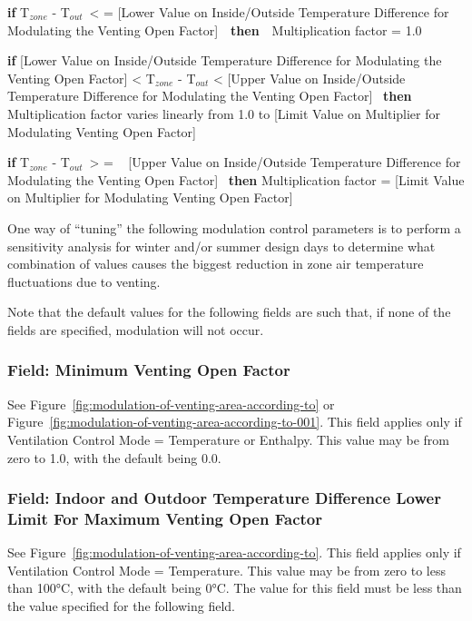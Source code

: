 \textbf{if} T\(_{zone}\) - T\(_{out}\)~\textless{} = {[}Lower Value on Inside/Outside Temperature Difference for Modulating the Venting Open Factor{]}~~\textbf{then}~~Multiplication factor = 1.0

\textbf{if} {[}Lower Value on Inside/Outside Temperature Difference for Modulating the Venting Open Factor{]} \textless{} T\(_{zone}\) - T\(_{out}\) \textless{} {[}Upper Value on Inside/Outside Temperature Difference for Modulating the Venting Open Factor{]}~ \textbf{then} Multiplication factor varies linearly from 1.0 to {[}Limit Value on Multiplier for Modulating Venting Open Factor{]}

\textbf{if} T\(_{zone}\) - T\(_{out}\)~\textgreater{} = ~ {[}Upper Value on Inside/Outside Temperature Difference for Modulating the Venting Open Factor{]}~ \textbf{then} Multiplication factor = {[}Limit Value on Multiplier for Modulating Venting Open Factor{]}

One way of ``tuning'' the following modulation control parameters is to perform a sensitivity analysis for winter and/or summer design days to determine what combination of values causes the biggest reduction in zone air temperature fluctuations due to venting.

Note that the default values for the following fields are such that, if none of the fields are specified, modulation will not occur.

\subsubsection{Field: Minimum Venting Open Factor}\label{field-minimum-venting-open-factor-1}

See Figure~\ref{fig:modulation-of-venting-area-according-to} or Figure~\ref{fig:modulation-of-venting-area-according-to-001}. This field applies only if Ventilation Control Mode = Temperature or Enthalpy. This value may be from zero to 1.0, with the default being 0.0.

\subsubsection{Field: Indoor and Outdoor Temperature Difference Lower Limit For Maximum Venting Open Factor}\label{field-indoor-and-outdoor-temperature-difference-lower-limit-for-maximum-venting-open-factor-1}

See Figure~\ref{fig:modulation-of-venting-area-according-to}. This field applies only if Ventilation Control Mode = Temperature. This value may be from zero to less than 100°C, with the default being 0°C. The value for this field must be less than the value specified for the following field.

